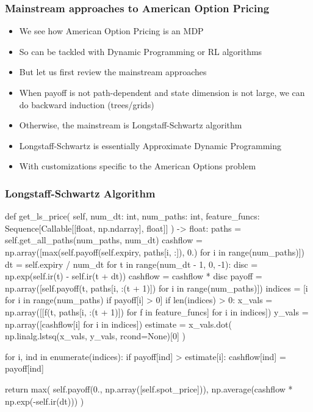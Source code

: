 \documentclass{beamer}
\begin{document}
\begin{frame}
\frametitle{Mainstream approaches to American Option Pricing}
\begin{itemize}
\item We see how American Option Pricing is an MDP
\item So can be tackled with Dynamic Programming or RL algorithms
\item But let us first review the mainstream approaches
\item When payoff is not path-dependent and state dimension is not large, we can do backward induction (trees/grids)
\item Otherwise, the mainstream is Longstaff-Schwartz algorithm
\item Longstaff-Schwartz is essentially Approximate Dynamic Programming
\item With customizations specific to the American Options problem
\end{itemize}
\end{frame}

\begin{frame}
\frametitle{Longstaff-Schwartz Algorithm}
    def get_ls_price(
        self,
        num_dt: int,
        num_paths: int,
        feature_funcs: Sequence[Callable[[float, np.ndarray], float]]
    ) -> float:
        paths = self.get_all_paths(num_paths, num_dt)
        cashflow = np.array([max(self.payoff(self.expiry, paths[i, :]), 0.)
                             for i in range(num_paths)])
        dt = self.expiry / num_dt
        for t in range(num_dt - 1, 0, -1):
            disc = np.exp(self.ir(t) - self.ir(t + dt))
            cashflow = cashflow * disc
            payoff = np.array([self.payoff(t, paths[i, :(t + 1)]) for
                               i in range(num_paths)])
            indices = [i for i in range(num_paths) if payoff[i] > 0]
            if len(indices) > 0:
                x_vals = np.array([[f(t, paths[i, :(t + 1)]) for f in
                                    feature_funcs] for i in indices])
                y_vals = np.array([cashflow[i] for i in indices])
                estimate = x_vals.dot(
                    np.linalg.lstsq(x_vals, y_vals, rcond=None)[0]
                )

                for i, ind in enumerate(indices):
                    if payoff[ind] > estimate[i]:
                        cashflow[ind] = payoff[ind]

        return max(
            self.payoff(0., np.array([self.spot_price])),
            np.average(cashflow * np.exp(-self.ir(dt)))
        )
\end{frame}
\end{document}
